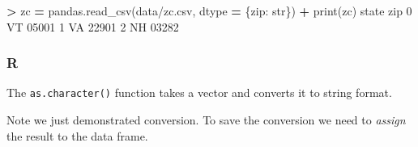\documentclass[
]{book}
\newenvironment{Shaded}{\begin{snugshade}}{\end{snugshade}}
\newcommand{\BuiltInTok}[1]{#1}
\newcommand{\CommentTok}[1]{\textcolor[rgb]{0.56,0.35,0.01}{\textit{#1}}}
\newcommand{\DecValTok}[1]{\textcolor[rgb]{0.00,0.00,0.81}{#1}}
\newcommand{\ErrorTok}[1]{\textcolor[rgb]{0.64,0.00,0.00}{\textbf{#1}}}
\newcommand{\FunctionTok}[1]{\textcolor[rgb]{0.00,0.00,0.00}{#1}}
\newcommand{\NormalTok}[1]{#1}
\newcommand{\OperatorTok}[1]{\textcolor[rgb]{0.81,0.36,0.00}{\textbf{#1}}}
\newcommand{\OtherTok}[1]{\textcolor[rgb]{0.56,0.35,0.01}{#1}}
\newcommand{\SpecialCharTok}[1]{\textcolor[rgb]{0.00,0.00,0.00}{#1}}
\newcommand{\StringTok}[1]{\textcolor[rgb]{0.31,0.60,0.02}{#1}}
\begin{document}
\begin{Shaded}
\begin{Highlighting}[]
\OperatorTok{\textgreater{}}\NormalTok{ zc }\OperatorTok{=}\NormalTok{ pandas.read\_csv(}\StringTok{\textquotesingle{}data/zc.csv\textquotesingle{}}\NormalTok{, dtype }\OperatorTok{=}\NormalTok{ \{}\StringTok{\textquotesingle{}zip\textquotesingle{}}\NormalTok{: }\StringTok{\textquotesingle{}str\textquotesingle{}}\NormalTok{\})}
\OperatorTok{+} \BuiltInTok{print}\NormalTok{(zc)}
\NormalTok{  state    }\BuiltInTok{zip}
\DecValTok{0}\NormalTok{    VT  }\DecValTok{05001}
\DecValTok{1}\NormalTok{    VA  }\DecValTok{22901}
\DecValTok{2}\NormalTok{    NH  }\DecValTok{03282}
\end{Highlighting}
\end{Shaded}

\hypertarget{r-22}{%
\subsubsection*{R}\label{r-22}}

The \texttt{as.character()} function takes a vector and converts it to string format.

\begin{Shaded}
\end{Shaded}

Note we just demonstrated conversion. To save the conversion we need to \emph{assign} the result to the data frame.

\begin{Shaded}
\end{Shaded}
\end{document}
